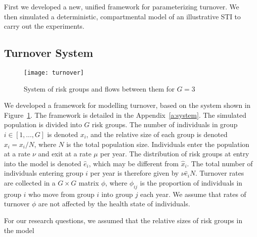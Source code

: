 First we developed a new, unified framework for parameterizing turnover. 
We then simulated a deterministic, compartmental model of
an illustrative STI to carry out the experiments.
\subsection{Turnover System}			%
\label{ss:system}
\begin{figure}
  \centering
  \texttt{[image: turnover]}
  \caption{System of risk groups and flows between them for $G = 3$}
  \label{fig:system}
\end{figure}
We developed a framework for modelling turnover,
based on the system shown in Figure~\ref{fig:system}.
The framework is detailed in the Appendix~\ref{a:system}.		%
The simulated population is divided into $G$ risk groups.
The number of individuals in group $i \in [1, \dots, G]$ is denoted $x_i$,
and the relative size of each group is denoted $\hat{x}_i = x_i / N$,
where $N$ is the total population size.
Individuals enter the population at a rate $\nu$ and exit at a rate $\mu$ per year.
The distribution of risk groups at entry into the model
is denoted $\hat{e}_i$, which may be different from $\hat{x}_i$.
The total number of individuals entering group $i$ per year
is therefore given by $\nu \hat{e}_i N$.
Turnover rates are collected in a $G \times G$ matrix $\phi$,
where $\phi_{ij}$ is the proportion of individuals in group $i$
who move from group $i$ into group $j$ each year.
We assume that rates of turnover $\phi$
are not affected by the health state of individuals. 		%
\par
For our research questions,			
we assumed that the relative sizes of risk groups in the model	%
